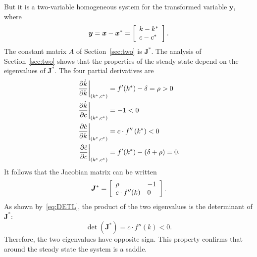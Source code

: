 \documentclass[letterpaper,12pt,leqno]{article}
\begin{document}
But it is a two-variable homogeneous system for the transformed variable $\bm{y}$, where
\begin{equation*}
\bm{y}=\bm{x}-\bm{x}^{*}=\left[ 
\begin{array}{l}
k-k^{*}\\ 
c-c^{*}
\end{array} \right].
\end{equation*}
The constant matrix $A$ of Section~\ref{sec:two} is $\bm{J}^{*}$. The analysis of Section~\ref{sec:two} shows that the properties of the steady state depend on the eigenvalues of $\bm{J}^{*}$. The four partial derivatives are
\begin{align*}
\left.\frac{\partial \dot{k}}{\partial k}\right\vert_{(k^{*},c^{*})}&=f'(k^{*}) -\delta =\rho >0 \\
\left.\frac{\partial \dot{k}}{\partial c}\right\vert_{(k^{*},c^{*})}&=-1<0 \\
\left.\frac{\partial \dot{c}}{\partial k}\right\vert_{(k^{*},c^{*})}&=c\cdot f''\left( k^{*} \right) <0 \\
\left.\frac{\partial \dot{c}}{\partial c}\right\vert_{(k^{*},c^{*})}&=f'(k^{*}) -\left( \delta +\rho \right) =0.
\end{align*}
It follows that the Jacobian matrix can be written 
\begin{equation*}
\bm{J}^{*}=\left[ 
\begin{array}{ll}
\rho  & -1  \\ 
c\cdot f''(k) & 0
\end{array} \right].
\end{equation*}
As shown by~\eqref{eq:DETL}, the product of the two eigenvalues is the determinant of $\bm{J}^{*}$:  \[\det(\bm{J}^{*})=c\cdot f''(k) <0.\] Therefore, the two eigenvalues have opposite sign. This property confirms that around the steady state the system is a saddle.
\end{document}
